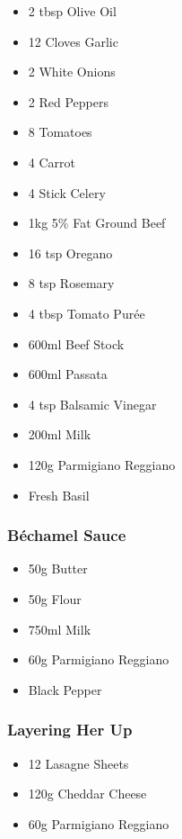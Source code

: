 \documentclass[11pt, english]{article}
\begin{document}
	\begin{itemize}
        \setlength\itemsep{0cm}
		\item 2 tbsp Olive Oil
		\item 12 Cloves Garlic
		\item 2 White Onions
		\item 2 Red Peppers
		\item 8 Tomatoes
		\item 4 Carrot
		\item 4 Stick Celery
		\item 1kg 5\% Fat Ground Beef
		\item 16 tsp Oregano
		\item 8 tsp Rosemary
		\item 4 tbsp Tomato Pur\'{e}e
		\item 600ml Beef Stock
		\item 600ml Passata
		\item 4 tsp Balsamic Vinegar
		\item 200ml Milk
		\item 120g Parmigiano Reggiano
		\item Fresh Basil
        \end{itemize}

		\subsubsection*{B\'{e}chamel Sauce}

	\begin{itemize}
        \setlength\itemsep{0cm}
                \item 50g Butter
		\item 50g Flour
		\item 750ml Milk
		\item 60g Parmigiano Reggiano
		\item Black Pepper
        \end{itemize}

		\subsubsection*{Layering Her Up}

	\begin{itemize}
        \setlength\itemsep{0cm}
                \item 12 Lasagne Sheets
		\item 120g Cheddar Cheese
		\item 60g Parmigiano Reggiano
        \end{itemize}
\end{document}

